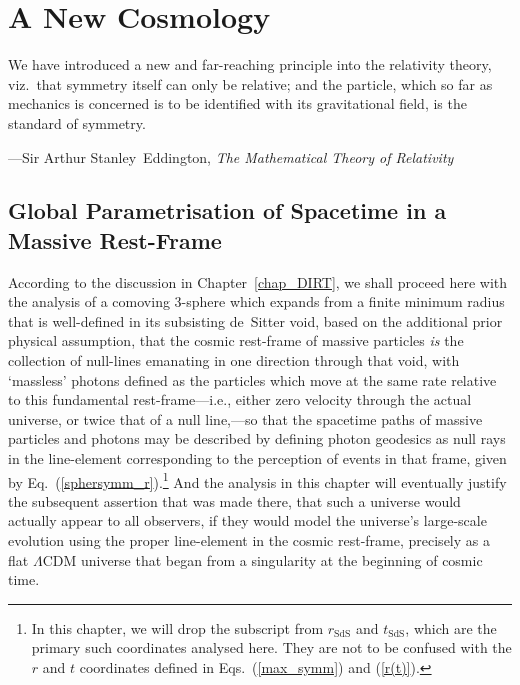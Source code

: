 \chapter{A New Cosmology\label{chap_ANC}}
\epigraph{We have introduced a new and far-reaching principle into the relativity theory, viz.~that symmetry itself can only be relative; and the particle, which so far as mechanics is concerned is to be identified with its gravitational field, is the standard of symmetry.}{---Sir Arthur Stanley~Eddington, \textit{The Mathematical Theory of Relativity}}
\section{Global Parametrisation of Spacetime in a Massive Rest-Frame\label{sec_GPSMRF}}
According to the discussion in Chapter~\ref{chap_DIRT}, we shall proceed here with the analysis of a comoving 3-sphere which expands from a finite minimum radius that is well-defined in its subsisting de~Sitter void, based on the additional prior physical assumption, that the cosmic rest-frame of massive particles \textit{is} the collection of null-lines emanating in one direction through that void, with `massless' photons defined as the particles which move at the same rate relative to this fundamental rest-frame---i.e., either zero velocity through the actual universe, or twice that of a null line,---so that the spacetime paths of massive particles and photons may be described by defining photon geodesics as null rays in the line-element corresponding to the perception of events in that frame, given by Eq.~(\ref{sphersymm_r}).\footnote{In this chapter, we will drop the subscript from $r_{\mathrm{SdS}}$ and $t_{\mathrm{SdS}}$, which are the primary such coordinates analysed here. They are not to be confused with the $r$ and $t$ coordinates defined in Eqs.~(\ref{max_symm}) and (\ref{r(t)}).} And the analysis in this chapter will eventually justify the subsequent assertion that was made there, that such a universe would actually appear to all observers, if they would model the universe's large-scale evolution using the proper line-element in the cosmic rest-frame, precisely as a flat $\Lambda$CDM universe that began from a singularity at the beginning of cosmic time. 


